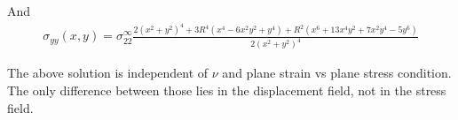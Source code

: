 \documentclass[12pt]{article}
\begin{document}
And 
\begin{eqnarray}
 \sigma_{yy}(x,y) = \sigma_{22}^\infty 
\frac{2(x^2+y^2)^4 + 3R^4(x^4-6x^2y^2+y^4)+R^2(x^6+13x^4y^2+7x^2y^4-5y^6)}{2(x^2+y^2)^4}
\end{eqnarray}

\begin{figure}[th]
\begin{center}
\end{center}
\caption{}
\label{CylindricalVoid}
\end{figure}

The above solution is independent of $\nu$ and plane strain vs plane
stress condition.  The only difference between those lies in the
displacement field, not in the stress field.


\end{document}
